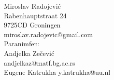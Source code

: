 \documentclass[10pt]{report}
\begin{document}
\begin{center}
	\bigskip

  	{\Large Miroslav Radojevi\'{c}}\\[0.5em]
  	Rabenhauptstraat 24\\
  	9725CD Groningen\\
  	miroslav.radojevic@gmail.com\\[1em]
  	{\normalsize Paranimfen:}\\[0.5em]
  	Andjelka Ze\v{c}evi\'{c}\\
  	andjelkaz@matf.bg.ac.rs\\[0.5em]
  	Eugene Katrukha
  	y.katrukha@uu.nl
  
\end{center}

\end{document}
